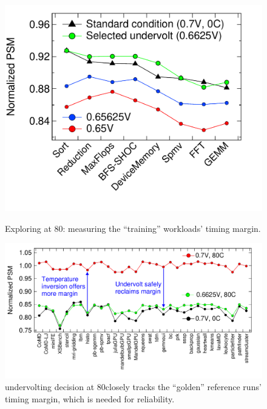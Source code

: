 \begin{figure}[t!]
  \centering
  \begin{minipage}{0.38\linewidth}
      \vspace{-0.16in}
    \centering
      \includegraphics[trim=-30 0 0 0,clip, width=0.95\linewidth]{graphs/temperature/explore-uv-shoc.pdf}
      \caption{Exploring \tistate at 80\C: measuring the ``training'' workloads' timing margin.}
      \label{fig:train-uv}
  \end{minipage}
\hfill
  \begin{minipage}{0.56\linewidth}
    \centering
        \vspace{-0.1in}
        \includegraphics[trim=0 20 30 15,clip,width=0.95\linewidth]{graphs/temperature/validate-uv.pdf}
        \caption{\tistate undervolting decision at 80\C closely tracks the ``golden'' reference runs' timing margin, which is needed for reliability.}
        \label{fig:validate-uv}
  \end{minipage}
  \vspace*{-0.1in}
\end{figure}


